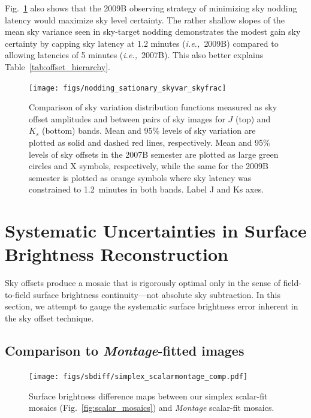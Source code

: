 \documentclass[iop]{emulateapj}
\newcommand{\ie}{\textit{i.e.,~}}
\newcommand{\sw}[1]{\textit{#1}} %
\newcommand{\todo}[1]{\textcolor{BurntOrange}{\textsf{#1}}} %
\newcommand{\Fig}[1]{Fig.~\ref{fig:#1}}  %
\newcommand{\Tab}[1]{Table~\ref{tab:#1}}  %
\begin{document}
\Fig{nodding_stationary_skyvar_skyfrac} also shows that the 2009B observing strategy of minimizing sky nodding latency would maximize sky level certainty.
The rather shallow slopes of the mean sky variance seen in sky-target nodding demonstrates the modest gain sky certainty by capping sky latency at 1.2 minutes (\ie 2009B) compared to allowing latencies of 5 minutes (\ie 2007B).
This also better explains \Tab{offset_hierarchy}.

\begin{figure}[t]
\centering
\texttt{[image: figs/nodding\_sationary\_skyvar\_skyfrac]}
\caption{Comparison of sky variation distribution functions measured as sky offset amplitudes and between pairs of sky images for $J$ (top) and $K_s$ (bottom) bands.
Mean and 95\% levels of sky variation are plotted as solid and dashed red lines, respectively.
Mean and 95\% levels of sky offsets in the 2007B semester are plotted as large green circles and X symbols, respectively, while the same for the 2009B semester is plotted as orange symbols where sky latency was constrained to 1.2~minutes in both bands.
\todo{Label J and Ks axes}.}
\label{fig:nodding_stationary_skyvar_skyfrac}
\end{figure}


\section{Systematic Uncertainties in Surface Brightness Reconstruction}
\label{sec:systematics}

Sky offsets produce a mosaic that is rigorously optimal only in the sense of field-to-field surface brightness continuity---not absolute sky subtraction. In this section, we attempt to gauge the systematic surface brightness error inherent in the sky offset technique.


\subsection{Comparison to \sw{Montage}-fitted images}

\begin{figure}[t]
    \centering
        \texttt{[image: figs/sbdiff/simplex\_scalarmontage\_comp.pdf]}
        \caption{Surface brightness difference maps between our simplex scalar-fit mosaics (\Fig{scalar_mosaics}) and \sw{Montage} scalar-fit mosaics.}
    \label{fig:simplex_scalarmontage_comp}
\end{figure}
\end{document}
